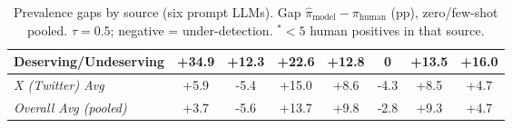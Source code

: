 \begin{table}[htbp]
{\begin{tabular}{lccccccc}
Deserving/Undeserving & +34.9 & +12.3 & +22.6 & +12.8 & 0 & +13.5 & +16.0 \\
\midrule
\textit{X (Twitter) Avg} & +5.9 & -5.4 & +15.0 & +8.6 & -4.3 & +8.5 & +4.7 \\
\midrule
\textit{Overall Avg (pooled)} & +3.7 & -5.6 & +13.7 & +9.8 & -2.8 & +9.3 & +4.7 \\
\bottomrule
\end{tabular}
}
\caption{Prevalence gaps by source (six prompt LLMs). Gap $\hat{\pi}_{\mathrm{model}}-\pi_{\mathrm{human}}$ (pp), zero/few-shot pooled. $\tau{=}0.5$; negative = under-detection. {$^*$}${<}5$ human positives in that source.}
\label{tab:underdetection_delta_by_source}
\end{table}
